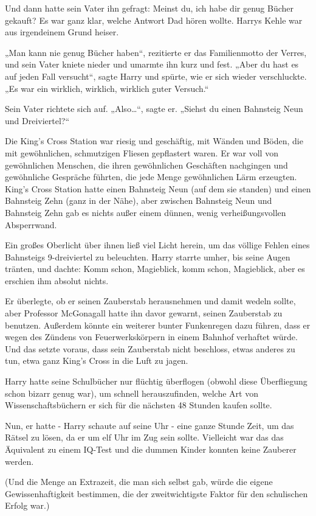 {Und dann hatte sein Vater ihn gefragt: Meinst du, ich habe dir genug Bücher gekauft? Es war ganz klar, welche Antwort Dad hören wollte. Harrys Kehle war aus irgendeinem Grund heiser.

„Man kann nie genug Bücher haben“, rezitierte er das Familienmotto der Verres, und sein Vater kniete nieder und umarmte ihn kurz und fest. „Aber du hast es auf jeden Fall versucht“, sagte Harry und spürte, wie er sich wieder verschluckte. „Es war ein wirklich, wirklich, wirklich guter Versuch.“

Sein Vater richtete sich auf. „Also…“, sagte er. „Siehst du einen Bahnsteig Neun und Dreiviertel?“

Die King's Cross Station war riesig und geschäftig, mit Wänden und Böden, die mit gewöhnlichen, schmutzigen Fliesen gepflastert waren. Er war voll von gewöhnlichen Menschen, die ihren gewöhnlichen Geschäften nachgingen und gewöhnliche Gespräche führten, die jede Menge gewöhnlichen Lärm erzeugten. King's Cross Station hatte einen Bahnsteig Neun (auf dem sie standen) und einen Bahnsteig Zehn (ganz in der Nähe), aber zwischen Bahnsteig Neun und Bahnsteig Zehn gab es nichts außer einem dünnen, wenig verheißungsvollen Absperrwand.

Ein großes Oberlicht über ihnen ließ viel Licht herein, um das völlige Fehlen eines Bahnsteigs 9-dreiviertel zu beleuchten. Harry starrte umher, bis seine Augen tränten, und dachte: Komm schon, Magieblick, komm schon, Magieblick, aber es erschien ihm absolut nichts.

Er überlegte, ob er seinen Zauberstab herausnehmen und damit wedeln sollte, aber Professor McGonagall hatte ihn davor gewarnt, seinen Zauberstab zu benutzen. Außerdem könnte ein weiterer bunter Funkenregen dazu führen, dass er wegen des Zündens von Feuerwerkskörpern in einem Bahnhof verhaftet würde. Und das setzte voraus, dass sein Zauberstab nicht beschloss, etwas anderes zu tun, etwa ganz King's Cross in die Luft zu jagen.

Harry hatte seine Schulbücher nur flüchtig überflogen (obwohl diese Überfliegung schon bizarr genug war), um schnell herauszufinden, welche Art von Wissenschaftsbüchern er sich für die nächsten 48 Stunden kaufen sollte.

Nun, er hatte - Harry schaute auf seine Uhr - eine ganze Stunde Zeit, um das Rätsel zu lösen, da er um elf Uhr im Zug sein sollte. Vielleicht war das das Äquivalent zu einem IQ-Test und die dummen Kinder konnten keine Zauberer werden.

(Und die Menge an Extrazeit, die man sich selbst gab, würde die eigene Gewissenhaftigkeit bestimmen, die der zweitwichtigste Faktor für den schulischen Erfolg war.)

}
